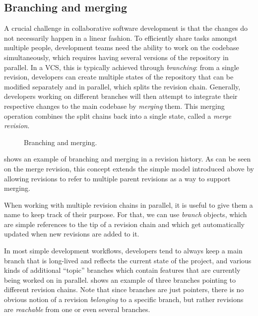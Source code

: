 \subsection{Branching and merging}

A crucial challenge in collaborative software development is that the changes
do not necessarily happen in a linear fashion. To efficiently share tasks amongst
multiple people, development teams need the ability to work on the codebase
simultaneously, which requires having several versions of the repository in
parallel. In a \gls{VCS}, this is typically achieved through \emph{branching}:
from a single revision, developers can create multiple states of the repository
that can be modified separately and in parallel, which splits the revision
chain.  Generally, developers working on different branches will then attempt
to integrate their respective changes to the main codebase by \emph{merging}
them.  This merging operation combines the split chains back into a single
state, called a \emph{merge revision}.

\begin{figure}
    \centering
    
    \caption{Branching and merging.}%
    \label{fig:vcs-rev-branching-merging}
\end{figure}

 shows an example of branching and
merging in a revision history.  As can be seen on the merge revision, this
concept extends the simple model introduced above by allowing revisions to
refer to multiple parent revisions as a way to support merging.

When working with multiple revision chains in parallel, it is useful to give
them a name to keep track of their purpose. For that, we can use
\emph{branch} objects, which are simple references to the tip of a revision
chain and which get automatically updated when new revisions are added to it.

In most simple development workflows, developers tend to always keep a main
branch that is long-lived and reflects the current state of the project, and
various kinds of additional ``topic'' branches which contain features that are
currently being worked on in parallel.  shows an
example of three branches pointing to different revision chains. Note that
since branches are just pointers, there is no obvious notion of a revision
\emph{belonging} to a specific branch, but rather revisions are
\emph{reachable} from one or even several branches.


